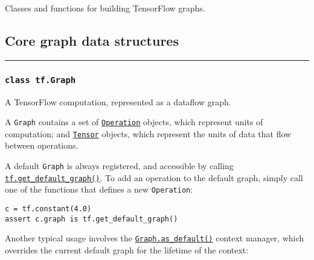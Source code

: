 Classes and functions for building TensorFlow graphs.

\subsection{Core graph data structures}\label{core-graph-data-structures}

\begin{center}\rule{0.5\linewidth}{\linethickness}\end{center}

\subsubsection{\texorpdfstring{\lstinline{class tf.Graph}}{class tf.Graph }}\label{class-tf.graph}

A TensorFlow computation, represented as a dataflow graph.

A \lstinline{Graph} contains a set of
\href{../../api_docs/python/framework.md\#Operation}{\lstinline{Operation}}
objects, which represent units of computation; and
\href{../../api_docs/python/framework.md\#Tensor}{\lstinline{Tensor}}
objects, which represent the units of data that flow between operations.

A default \lstinline{Graph} is always registered, and accessible by calling
\href{../../api_docs/python/framework.md\#get_default_graph}{\lstinline{tf.get_default_graph()}}.
To add an operation to the default graph, simply call one of the
functions that defines a new \lstinline{Operation}:

\begin{lstlisting}
c = tf.constant(4.0)
assert c.graph is tf.get_default_graph()
\end{lstlisting}

Another typical usage involves the
\href{../../api_docs/python/framework.md\#Graph.as_default}{\lstinline{Graph.as_default()}}
context manager, which overrides the current default graph for the
lifetime of the context:

\begin{Shaded}
\begin{Highlighting}[]
\OperatorTok{=} 
 
  \OperatorTok{=} \NormalTok{)}
    
\end{Highlighting}
\end{Shaded}

